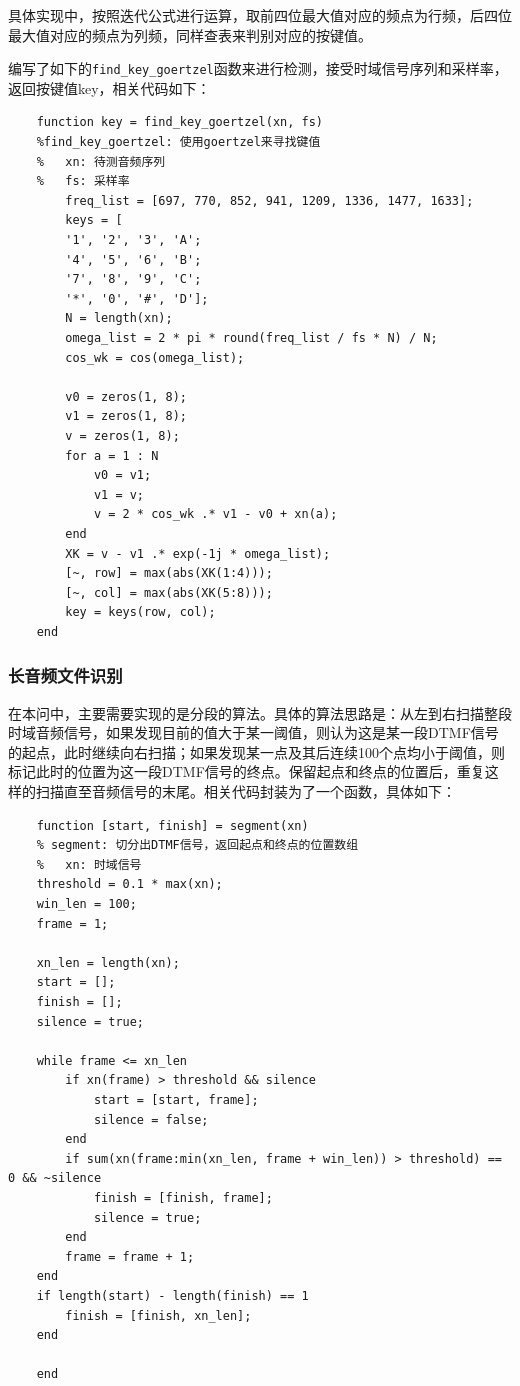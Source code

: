 \documentclass[10pt, a4paper]{article}
\begin{document}
    具体实现中，按照迭代公式进行运算，取前四位最大值对应的频点为行频，后四位最大值对应的频点为列频，同样查表来判别对应的按键值。
    
    编写了如下的\texttt{find\_key\_goertzel}函数来进行检测，接受时域信号序列和采样率，返回按键值key，相关代码如下：
    
    \begin{lstlisting}
    function key = find_key_goertzel(xn, fs)
    %find_key_goertzel: 使用goertzel来寻找键值
    %   xn: 待测音频序列
    %   fs: 采样率
        freq_list = [697, 770, 852, 941, 1209, 1336, 1477, 1633];
        keys = [
        '1', '2', '3', 'A';
        '4', '5', '6', 'B';
        '7', '8', '9', 'C';
        '*', '0', '#', 'D'];
        N = length(xn);
        omega_list = 2 * pi * round(freq_list / fs * N) / N;
        cos_wk = cos(omega_list);
    
        v0 = zeros(1, 8);
        v1 = zeros(1, 8);
        v = zeros(1, 8);
        for a = 1 : N
            v0 = v1;
            v1 = v;
            v = 2 * cos_wk .* v1 - v0 + xn(a);
        end
        XK = v - v1 .* exp(-1j * omega_list);
        [~, row] = max(abs(XK(1:4)));
        [~, col] = max(abs(XK(5:8)));
        key = keys(row, col);
    end
    \end{lstlisting}

\subsubsection{长音频文件识别}

    在本问中，主要需要实现的是分段的算法。具体的算法思路是：从左到右扫描整段时域音频信号，如果发现目前的值大于某一阈值，则认为这是某一段DTMF信号的起点，此时继续向右扫描；如果发现某一点及其后连续100个点均小于阈值，则标记此时的位置为这一段DTMF信号的终点。保留起点和终点的位置后，重复这样的扫描直至音频信号的末尾。相关代码封装为了一个函数，具体如下：
    
    \begin{lstlisting}
    function [start, finish] = segment(xn)
    % segment: 切分出DTMF信号，返回起点和终点的位置数组
    %   xn: 时域信号
    threshold = 0.1 * max(xn);
    win_len = 100;
    frame = 1;
    
    xn_len = length(xn);
    start = [];
    finish = [];
    silence = true;
    
    while frame <= xn_len
        if xn(frame) > threshold && silence
            start = [start, frame];
            silence = false;
        end
        if sum(xn(frame:min(xn_len, frame + win_len)) > threshold) == 0 && ~silence
            finish = [finish, frame];
            silence = true;
        end
        frame = frame + 1;
    end
    if length(start) - length(finish) == 1
        finish = [finish, xn_len];
    end
    
    end
    \end{lstlisting}
\end{document}
